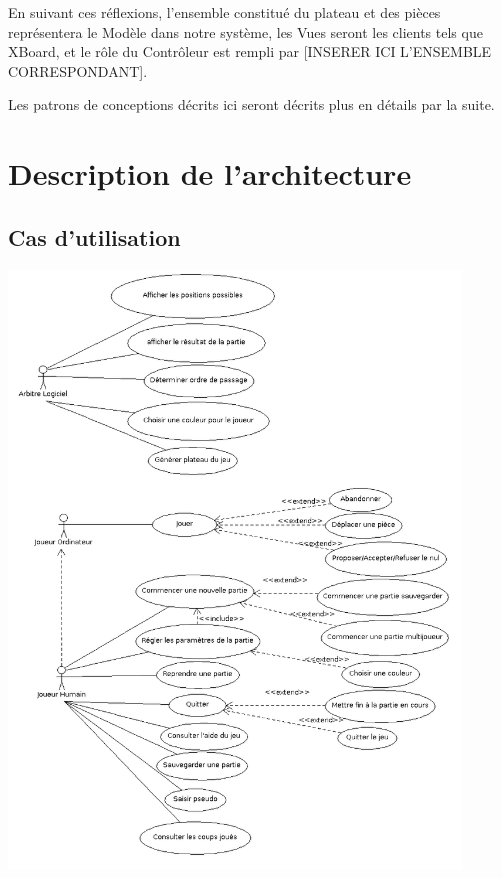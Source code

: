 \documentclass[11pt]{article}
\begin{document}
En suivant ces réflexions, l'ensemble constitué du plateau et des pièces représentera le Modèle dans notre système, les Vues seront les clients tels que XBoard, et le rôle du Contrôleur est rempli par [INSERER ICI L'ENSEMBLE CORRESPONDANT].

Les patrons de conceptions décrits ici seront décrits plus en détails par la suite.
\section{Description de l’architecture}
\label{sec-3}
\subsection{Cas d'utilisation}
\label{sec-3-1}
\includegraphics[width=0.9\textwidth]{Diagrammedecasdutilisation.png}
\end{document}
